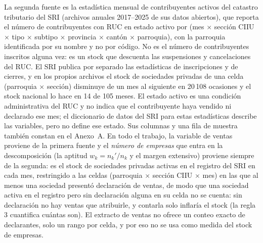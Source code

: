 \documentclass[12pt,a4paper]{article}
\begin{document}
La segunda fuente es la estadística mensual de contribuyentes activos del catastro tributario del SRI (archivos anuales 2017--2025 de sus datos abiertos), que reporta el número de contribuyentes con RUC en estado activo por (mes $\times$ sección CIIU $\times$ tipo $\times$ subtipo $\times$ provincia $\times$ cantón $\times$ parroquia), con la parroquia identificada por su nombre y no por código. No es el número de contribuyentes inscritos alguna vez: es un stock que descuenta las suspensiones y cancelaciones del RUC. El SRI publica por separado las estadísticas de inscripciones y de cierres, y en los propios archivos el stock de sociedades privadas de una celda (parroquia $\times$ sección) disminuye de un mes al siguiente en 20\,108 ocasiones y el stock nacional lo hace en 14 de 105 meses. El estado activo es una condición administrativa del RUC y no indica que el contribuyente haya vendido ni declarado ese mes; el diccionario de datos del SRI para estas estadísticas describe las variables, pero no define ese estado. Sus columnas y una fila de muestra también constan en el Anexo~A. En todo el trabajo, la variable de ventas proviene de la primera fuente y el \textit{número de empresas} que entra en la descomposición (la aptitud $w_k = n_k'/n_k$ y el margen extensivo) proviene siempre de la segunda: es el stock de sociedades privadas activas en el registro del SRI en cada mes, restringido a las celdas (parroquia $\times$ sección CIIU $\times$ mes) en las que al menos una sociedad presentó declaración de ventas, de modo que una sociedad activa en el registro pero sin declaración alguna en su celda no se cuenta: sin declaración no hay ventas que atribuirle, y contarla solo inflaría el stock (la regla 3 cuantifica cuántas son). El extracto de ventas no ofrece un conteo exacto de declarantes, solo un rango por celda, y por eso no se usa como medida del stock de empresas.
\par
\end{document}
